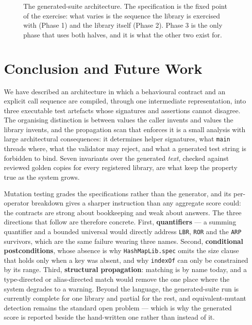 \documentclass[conference]{IEEEtran}
\begin{document}
\begin{figure}[H]
{}
\caption{The generated-suite architecture. The specification is the fixed point of the
exercise: what varies is the sequence the library is exercised with (Phase 1) and the
library itself (Phase 2). Phase 3 is the only phase that uses both halves, and it is
what the other two exist for.}
\label{fig:suites}
\end{figure}

\section{Conclusion and Future Work}

We have described an architecture in which a behavioural contract and an explicit call
sequence are compiled, through one intermediate representation, into three executable
test artefacts whose signatures and assertions cannot disagree. The organising
distinction is between values the caller invents and values the library invents, and
the propagation scan that enforces it is a small analysis with large architectural
consequences: it determines helper signatures, what \texttt{main} threads where, what
the validator may reject, and what a generated test string is forbidden to bind. Seven
invariants over the generated \emph{text}, checked against reviewed golden copies for
every registered library, are what keep the property true as the system grows.

Mutation testing grades the specifications rather than the generator, and its
per-operator breakdown gives a sharper instruction than any aggregate score could: the
contracts are strong about bookkeeping and weak about answers. The three directions
that follow are therefore concrete. First, \textbf{quantifiers} --- a summing quantifier
and a bounded universal would directly address \texttt{LBR}, \texttt{ROR} and the
\texttt{ARP} survivors, which are the same failure wearing three names. Second,
\textbf{conditional postconditions}, whose absence is why \texttt{HashMapLib.spec} omits
the size clause that holds only when a key was absent, and why \texttt{indexOf} can only
be constrained by its range. Third, \textbf{structural propagation}: matching is by name
today, and a type-directed or alias-directed match would remove the one place where the
system degrades to a warning. Beyond the language, the generated-suite run is currently
complete for one library and partial for the rest, and equivalent-mutant detection
remains the standard open problem --- which is why the generated score is reported
beside the hand-written one rather than instead of it.
\end{document}
